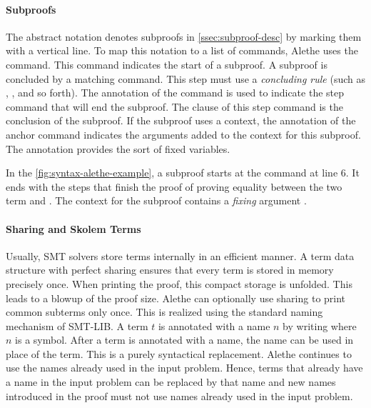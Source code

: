 \paragraph{Subproofs}
The abstract notation denotes subproofs in \cref{ssec:subproof-desc} by marking them with a vertical line.
To map this notation to a list of commands, Alethe uses the  command.
This command indicates the start of a subproof. A subproof is concluded by a matching  command.
This step must use a \emph{concluding rule} (such as , , and so forth).
The  annotation of the  command is used to indicate the step command that will end the subproof.
The clause of this step command is the conclusion of the subproof.
If the subproof uses a context, the  annotation of the anchor command indicates the arguments added to the context for this subproof.
The annotation provides the sort of fixed variables.

In the \cref{fig:syntax-alethe-example}, a subproof starts at the  command at line 6.
It ends with the  steps that finish the proof of proving equality between the two term  and .
The context for the subproof  contains a \emph{fixing} argument .

\paragraph{Sharing and Skolem Terms}

Usually, SMT solvers store terms internally in an efficient manner.
A term data structure with perfect sharing ensures that every term is stored in memory precisely once.
When printing the proof, this compact storage is unfolded. This leads to a blowup of the proof size.
Alethe can optionally use sharing to print common subterms only once.
This is realized using the standard naming mechanism of SMT-LIB. A term $t$
is annotated with a name $n$ by writing  where $n$ is a symbol.
After a term is annotated with a name, the name can be used in place of the term.
This is a purely syntactical replacement.
Alethe continues to use the names already used in the input problem.
Hence, terms that already have a name in the input problem can be replaced by that name and new
names introduced in the proof must not use names already used in the input problem.

